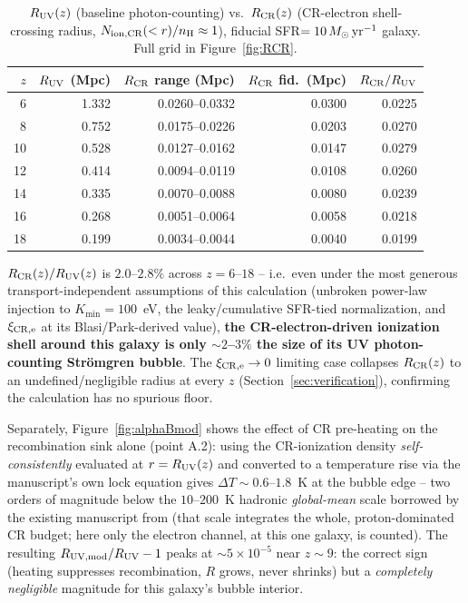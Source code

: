 \documentclass[11pt,a4paper]{article}
\newcommand{\Msun}{\,M_\odot}
\begin{document}
\begin{table}[H]
\centering\small
\begin{tabular}{@{}rrrrr@{}}
\toprule
$z$ & $R_{\rm UV}$ (Mpc) & $R_{\rm CR}$ range (Mpc) & $R_{\rm CR}$ fid.\ (Mpc) & $R_{\rm CR}/R_{\rm UV}$ \\
\midrule
6  & 1.332 & 0.0260--0.0332 & 0.0300 & 0.0225 \\
8  & 0.752 & 0.0175--0.0226 & 0.0203 & 0.0270 \\
10 & 0.528 & 0.0127--0.0162 & 0.0147 & 0.0279 \\
12 & 0.414 & 0.0094--0.0119 & 0.0108 & 0.0260 \\
14 & 0.335 & 0.0070--0.0088 & 0.0080 & 0.0239 \\
16 & 0.268 & 0.0051--0.0064 & 0.0058 & 0.0218 \\
18 & 0.199 & 0.0034--0.0044 & 0.0040 & 0.0199 \\
\bottomrule
\end{tabular}
\caption{$R_{\rm UV}(z)$ (baseline photon-counting) vs.\ $R_{\rm CR}(z)$ (CR-electron
shell-crossing radius, $N_{\rm ion,CR}(<r)/n_{\rm H}\approx1$), fiducial SFR$=10\Msun\,{\rm
yr}^{-1}$ galaxy. Full grid in Figure~\ref{fig:RCR}.}
\label{tab:phase2}
\end{table}

$R_{\rm CR}(z)/R_{\rm UV}(z)$ is $\mathbf{2.0\text{--}2.8\%}$ across $z=6$--$18$ -- i.e.\ even
under the most generous transport-independent assumptions of this calculation (unbroken
power-law injection to $K_{\min}=100$~eV, the leaky/cumulative SFR-tied normalization, and
$\xi_{\rm CR,e}$ at its Blasi/Park-derived value), \textbf{the CR-electron-driven ionization
shell around this galaxy is only $\sim2$--$3\%$ the size of its UV photon-counting
Str\"omgren bubble}. The $\xi_{\rm CR,e}\to0$ limiting case collapses $R_{\rm CR}(z)$ to an
undefined/negligible radius at every $z$ (Section~\ref{sec:verification}), confirming the
calculation has no spurious floor.

Separately, Figure~\ref{fig:alphaBmod} shows the effect of CR pre-heating on the
recombination sink alone (point A.2): using the CR-ionization density
\emph{self-consistently} evaluated at $r=R_{\rm UV}(z)$ and converted to a temperature rise via
the manuscript's own lock equation gives $\Delta T\sim0.6$--$1.8$~K at the bubble edge --
two orders of magnitude below the $10$--$200$~K hadronic \emph{global-mean} scale borrowed
by the existing manuscript from \citet{Leite2017} (that scale integrates the whole,
proton-dominated CR budget; here only the electron channel, at this one galaxy, is counted).
The resulting $R_{\rm UV,mod}/R_{\rm UV}-1$ peaks at $\sim5\times10^{-5}$ near $z\sim9$: the
correct sign (heating suppresses recombination, $R$ grows, never shrinks) but a
\emph{completely negligible} magnitude for this galaxy's bubble interior.
\end{document}
